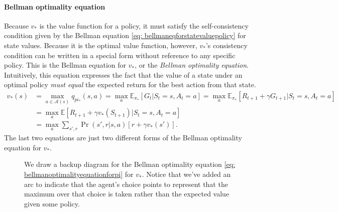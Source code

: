 \documentclass[12pt]{article}
\begin{document}
\paragraph{Bellman optimality equation}
Because $v_*$ is the value function for a policy, it must satisfy the self-consistency condition given by the Bellman equation \ref{eq: bellmaneqforstatevaluepolicy} for state values. Because it is the optimal value function, however, $v_*$'s consistency condition can be written in a special form without reference to any specific policy. This is the Bellman equation for $v_*$, or the \emph{Bellman optimality equation}. Intuitively, this equation expresses the fact that the value of a state under an optimal policy \emph{must   equal} the expected return for the best action from that state.
\begin{align}
  v_*(s) &= \max_{a \in \mathcal A(s)} q_{pi_*} (s,a) = \max_a \mathbb E_{\pi_*} \left[G_t | S_t = s, A_t = a \right] = \max_a \mathbb E_{\pi_*} \left[R_{t+1} +            \gamma G_{t+1} | S_t = s, A_t = a \right] \nonumber \\
         &= \max_a \mathbb E \left[R_{t+1} + \gamma v_*(S_{t+1}) | S_t = s, A_t                       = a \right] \\
  \label{eq: bellmanoptimalityequationforpi}
         &= \max_a \sum_{s',r} \Pr(s', r|s,a) \left[r + \gamma v_*(s')\right].
\end{align}
The last two equations are just two different forms of the Bellman optimality equation for $v_*$.
\begin{figure}[h]
  \centering
  \caption{\footnotesize We draw a backup diagram for the Bellman optimality equation \ref{eq: bellmanoptimalityequationforpi} for $v_*$. Notice that we've added an arc to indicate that the agent's choice points to represent that the maximum over that choice is taken rather than the expected value given some policy.}
\end{figure}
\end{document}
